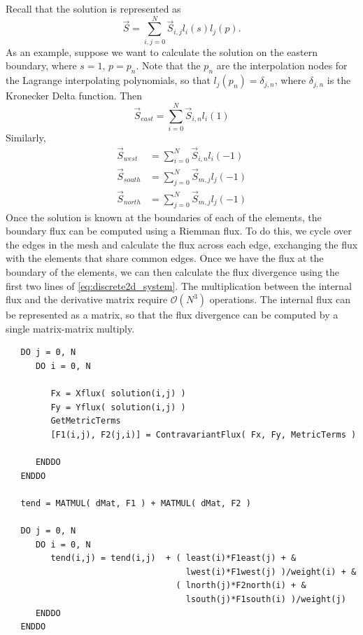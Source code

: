 \documentclass{softwaremanual}
\begin{document}
Recall that the solution is represented as
\begin{equation}
\vec{S} =  \sum_{i,j=0}^N \vec{S}_{i,j} l_i(s) l_j(p).
\end{equation}
As an example, suppose we want to calculate the solution on the eastern boundary, where $s = 1$, $p = p_n$. Note that the $p_n$ are the interpolation nodes for the Lagrange interpolating polynomials, so that $l_j(p_n) = \delta_{j,n}$, where $\delta_{j,n}$ is the Kronecker Delta function. Then
\begin{equation}
\vec{S}_{east} = \sum_{i=0}^N \vec{S}_{i,n} l_i(1)
\end{equation}
Similarly,
\begin{subequations}
\begin{align}
 \vec{S}_{west} &= \sum_{i=0}^N \vec{S}_{i,n} l_i(-1) \\
 \vec{S}_{south} &= \sum_{j=0}^N \vec{S}_{m,j} l_j(-1) \\
 \vec{S}_{north} &= \sum_{j=0}^N \vec{S}_{m,j} l_j(-1)
\end{align}
\end{subequations} 
Once the solution is known at the boundaries of each of the elements, the boundary flux can be computed using a Riemman flux. To do this, we cycle over the edges in the mesh and calculate the flux across each edge, exchanging the flux with the elements that share common edges. Once we have the flux at the boundary of the elements, we can then calculate the flux divergence using the first two lines of \eqref{eq:discrete2d_system}. The multiplication between the internal flux and the derivative matrix require $\mathcal{O}(N^3)$ operations. The internal flux can be represented as a matrix, so that the flux divergence can be computed by a single matrix-matrix multiply.

 \begin{verbatim}
   DO j = 0, N
      DO i = 0, N
         
         Fx = Xflux( solution(i,j) )
         Fy = Yflux( solution(i,j) )
         GetMetricTerms
         [F1(i,j), F2(j,i)] = ContravariantFlux( Fx, Fy, MetricTerms )
        
      ENDDO
   ENDDO
   
   tend = MATMUL( dMat, F1 ) + MATMUL( dMat, F2 )
   
   DO j = 0, N
      DO i = 0, N
         tend(i,j) = tend(i,j)  + ( least(i)*F1east(j) + &
                                    lwest(i)*F1west(j) )/weight(i) + & 
                                  ( lnorth(j)*F2north(i) + &
                                    lsouth(j)*F1south(i) )/weight(j)
      ENDDO
   ENDDO
 \end{verbatim}
 
\end{document}
